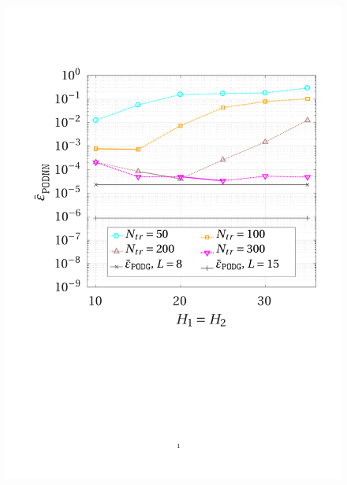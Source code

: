 \documentclass[12pt, a4paper, twoside, openright]{report}
\numberwithin{equation}{chapter}
\theoremstyle{theorem}
\theoremstyle{definition}
\theoremstyle{remark}
\theoremstyle{proposition}
\numberwithin{figure}{chapter}
\begin{document}
		\begin{figure}[H]
			\center
			\includegraphics[scale = 0.42, trim = {1cm 9cm 1.5cm 3.5cm}, clip]{poisson1d_2_nn_convergence}

\end{figure}
\end{document}
